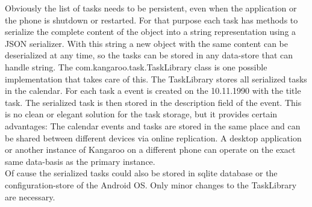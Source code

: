 Obviously the list of tasks needs to be persistent, even when the application or the phone is shutdown or restarted. For that purpose each task has methods to serialize the complete content of the object into a string representation using a JSON serializer. With this string a new object with the same content can be deserialized at any time, so the tasks can be stored in any data-store that can handle string. The com.kangaroo.task.TaskLibrary class is one possible implementation that takes care of this. The TaskLibrary stores all serialized tasks in the calendar. For each task a event is created on the 10.11.1990 with the title task. The serialized task is then stored in the description field of the event. This is no clean or elegant solution for the task storage, but it provides certain advantages: The calendar events and tasks are stored in the same place and can be shared between different devices via online replication. A desktop application or another instance of Kangaroo on a different phone can operate on the exact same data-basis as the primary instance. \\
Of cause the serialized tasks could also be stored in sqlite database or the configuration-store of the Android OS. Only minor changes to the TaskLibrary are necessary.

